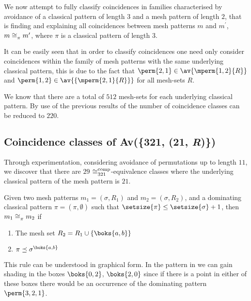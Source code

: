 We now attempt to fully classify coincidences in families characterised by avoidance
of a classical pattern of length \(3\) and a mesh pattern of length \(2\), that is
finding and explaining all coincidences between mesh patterns \(m\) and \(m^\prime\), \(m\coinc{\pi} m^\prime\),
where \(\pi\) is a classical pattern of length \(3\).

It can be easily seen that in order to classify coincidences one need only
consider coincidences within the family of mesh patterns with the same underlying
classical pattern, this is due to the fact that \(\perm{2,1}\in\av{\mperm{1,2}{R}}\)
and \(\perm{1,2}\in\av{\{\mperm{2,1}{R}\}}\) for all mesh-sets \(R\).

We know that there are a total of \(512\) mesh-sets for each underlying classical
pattern. By use of the previous results of \textcite{DBLP:journals/corr/ClaessonTU14}
the number of coincidence classes can be reduced to \(220\).

\subsection{Coincidence classes of Av(\{321, (21, \textit{R})\})}
Through experimentation, considering avoidance of permutations up to length \(11\), we discover
that there are \(29\) \(\coinc[comp]{321}\)-equivalence classes where the underlying classical pattern of the mesh pattern is \(21\).

\begin{proposition}
    \label{prop:dom1}
    Given two mesh patterns \(m_1 =(\sigma, R_1)\) and \(m_2 = (\sigma, R_2)\),
    and a dominating classical pattern \(\pi = (\pi,\emptyset)\) such that
    \(\setsize{\pi} \le \setsize{\sigma} + 1\), then \(m_1 \coinc{\pi} m_2 \)
    if
    \begin{enumerate}
        \item The mesh set \(R_2 = R_1 \cup \{\boks{a,b}\}\)
        \item \(\pi \preceq \sigma^\boks{a,b}\)\label{prop:dom1:cont}
    \end{enumerate}
\end{proposition}

This rule can be understood in graphical form. In the pattern in
 we can gain shading in the boxes \(\boks{0,2}\), \(\boks{2,0}\)
since if there is a point in either of these boxes there would be an occurrence of
the dominating pattern \(\perm{3,2,1}\).

